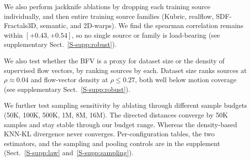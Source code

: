 We also perform jackknife ablations by dropping each
training source individually, and then entire training source families (Kubric, realflow, SDF-Fractals3D, semantic, and 2D-warps). We find the
spearman correlation remains within $[{+}0.43,{+}0.54]$, so no single source or family is load-bearing (see supplementary Sect.~\ref{S-supp:robust}).

We also test whether the BFV is a proxy for dataset size or the density of supervised
flow vectors, by ranking sources by each. Dataset size ranks sources at
$\rho{\approx}0.04$ and flow-vector density at $\rho{\le}0.27$, both well below motion
coverage (see supplementary Sect.~\ref{S-supp:robust}).

We further test sampling sensitivity by ablating through different sample budgets (50K, 100K, 500K, 1M, 8M, 16M). The directed distances converge by 50K samples and stay stable through our budget range. Whereas the density-based KNN-KL divergence never converges.
Per-configuration tables, the two estimators, and the sampling and pooling controls
are in the supplement (Sect.~\ref{S-supp:law} and~\ref{S-supp:sampling}).

